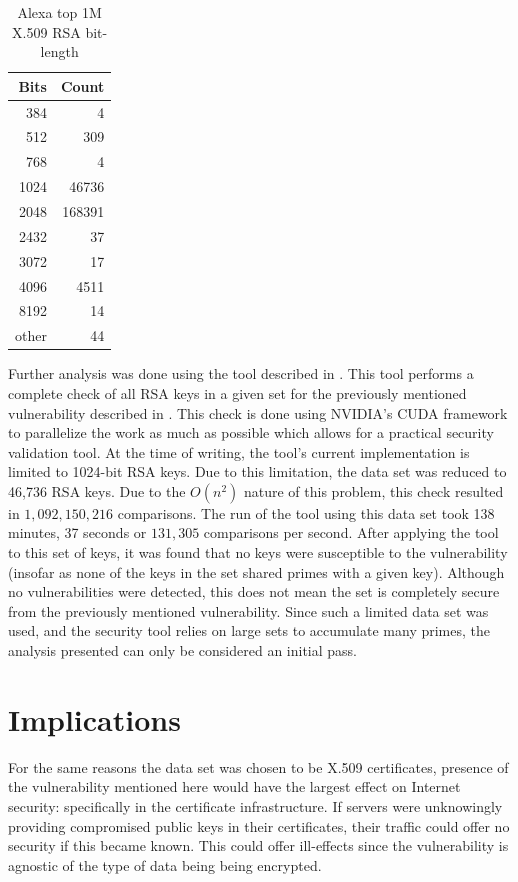 \documentclass{acm_proc_article-sp}
\begin{document}
\begin{table}
\centering
\caption{Alexa top 1M X.509 RSA bit-length}
\begin{tabular}{|r|r|}\hline
\textbf{Bits} & \textbf{Count}\\\hline
384 & 4 \\ \hline
512 & 309 \\ \hline
768 & 4 \\ \hline
1024 & 46736 \\ \hline
2048 & 168391 \\ \hline
2432 & 37 \\ \hline
3072 & 17 \\ \hline
4096 & 4511 \\ \hline
8192 & 14 \\ \hline
other & 44 \\ \hline
\end{tabular}
\label{tab:bits}
\end{table}

Further analysis was done using the tool described in
\cite{scharfglass2012breaking}. This tool performs a complete check of all
RSA keys in a given set for the previously mentioned vulnerability described
in \cite{lenstra2012ron}. This check is done using NVIDIA's CUDA framework to
parallelize the work as much as possible which allows for a practical security
validation tool. At the time of writing, the tool's current implementation is
limited to 1024-bit RSA keys. Due to this limitation, the data set was
reduced to 46,736 RSA keys. Due to the $O(n^2)$ nature of this problem,
this check resulted in $1,092,150,216$ comparisons. The run of the tool using
this data set took 138 minutes, 37 seconds or $131,305$ comparisons per second.
After applying the tool to this set of keys, it was found that no keys were
susceptible to the vulnerability (insofar as none of the keys in the set
shared primes with a given key). Although no vulnerabilities were detected,
this does not mean the set is completely secure from the previously mentioned
vulnerability. Since such a limited data set was used, and the security tool
relies on large sets to accumulate many primes, the analysis presented can
only be considered an initial pass.

\section{Implications}
For the same reasons the data set was chosen to be X.509 certificates, presence
of the vulnerability mentioned here would have the largest effect on Internet
security: specifically in the certificate infrastructure. If servers were
unknowingly providing compromised public keys in their certificates, their
traffic could offer no security if this became known. This could offer
ill-effects since the vulnerability is agnostic of the type of data being
being encrypted.
\end{document}
